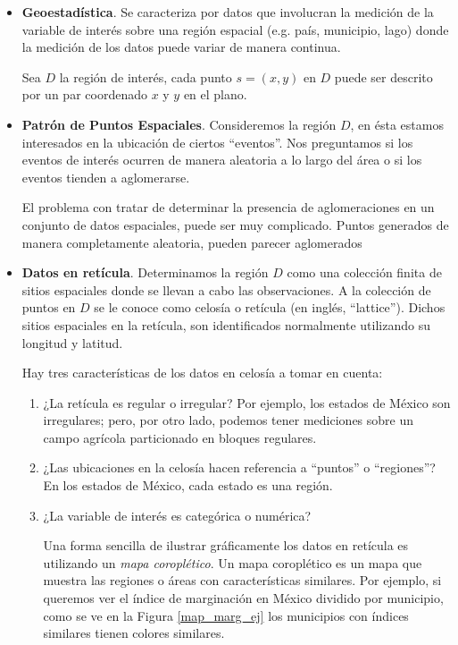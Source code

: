 \begin{itemize}

\item \textbf{Geoestadística}. Se caracteriza por datos que involucran la medición de la variable de interés sobre una región espacial (e.g. país, municipio, lago) donde la medición de los datos puede variar de manera continua.

Sea $D$ la región de interés, cada punto $s=(x,y)$ en $D$ puede ser descrito por un par coordenado $x$ y $y$ en el plano.

\item \textbf{Patrón de Puntos Espaciales}. Consideremos la región $D$, en ésta estamos interesados en la ubicación de ciertos ``eventos''. Nos preguntamos si los eventos de interés ocurren de manera aleatoria a lo largo del área o si los eventos tienden a aglomerarse.

El problema con tratar de determinar la presencia de aglomeraciones en un conjunto de datos espaciales, puede ser muy complicado. Puntos generados de manera completamente aleatoria, pueden parecer aglomerados

\item \textbf{Datos en retícula}. Determinamos la región $D$ como una colección finita de sitios espaciales donde se llevan a cabo las observaciones. A la colección de puntos en $D$ se le conoce como celosía o retícula (en inglés, ``lattice'').  Dichos sitios espaciales en la retícula, son identificados normalmente utilizando su longitud y latitud.

Hay tres características de los datos en celosía a tomar en cuenta:
\begin{enumerate}
\item ¿La retícula es regular o irregular? Por ejemplo, los estados de México son irregulares; pero, por otro lado, podemos tener mediciones sobre un campo agrícola particionado en bloques regulares.
\item ¿Las ubicaciones en la celosía hacen referencia a ``puntos'' o ``regiones''? En los estados de México, cada estado es una región.
\item ¿La variable de interés es categórica o numérica?

Una forma sencilla de ilustrar gráficamente los datos en retícula es utilizando un \textit{mapa coroplético}. Un mapa coroplético es un mapa que muestra las regiones o áreas con características similares. Por ejemplo, si queremos ver el índice de marginación en México dividido por municipio, como se ve en la Figura \ref{map_marg_ej} los municipios con índices similares tienen colores similares.


\end{enumerate}
\end{itemize}
